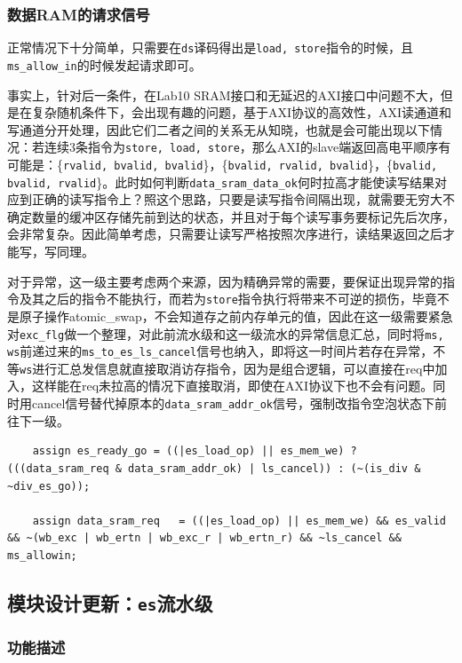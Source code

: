 \documentclass[UTF-8,twoside,c5size]{ctexart}
\begin{document}
	\subsubsection{数据RAM的请求信号}
	
	正常情况下十分简单，只需要在\texttt{ds}译码得出是\texttt{load, store}指令的时候，且\texttt{ms_allow_in}的时候发起请求即可。
	
	事实上，针对后一条件，在Lab10 SRAM接口和无延迟的AXI接口中问题不大，但是在复杂随机条件下，会出现有趣的问题，基于AXI协议的高效性，AXI读通道和写通道分开处理，因此它们二者之间的关系无从知晓，也就是会可能出现以下情况：若连续3条指令为\texttt{store, load, store}，那么AXI的slave端返回高电平顺序有可能是：\{\texttt{rvalid, bvalid, bvalid}\}，\{\texttt{bvalid, rvalid, bvalid}\}，\{\texttt{bvalid, bvalid, rvalid}\}。此时如何判断\texttt{data_sram_data_ok}何时拉高才能使读写结果对应到正确的读写指令上？照这个思路，只要是读写指令间隔出现，就需要无穷大不确定数量的缓冲区存储先前到达的状态，并且对于每个读写事务要标记先后次序，会非常复杂。因此简单考虑，只需要让读写严格按照次序进行，读结果返回之后才能写，写同理。
	
	对于异常，这一级主要考虑两个来源，因为精确异常的需要，要保证出现异常的指令及其之后的指令不能执行，而若为\texttt{store}指令执行将带来不可逆的损伤，毕竟不是原子操作atomic_swap，不会知道存之前内存单元的值，因此在这一级需要紧急对\texttt{exc_flg}做一个整理，对此前流水级和这一级流水的异常信息汇总，同时将\texttt{ms, ws}前递过来的\texttt{ms_to_es_ls_cancel}信号也纳入，即将这一时间片若存在异常，不等\texttt{ws}进行汇总发信息就直接取消访存指令，因为是组合逻辑，可以直接在req中加入，这样能在req未拉高的情况下直接取消，即使在AXI协议下也不会有问题。同时用cancel信号替代掉原本的\texttt{data_sram_addr_ok}信号，强制改指令空泡状态下前往下一级。
	
    \begin{verbatim}
    assign es_ready_go = ((|es_load_op) || es_mem_we) ? (((data_sram_req & data_sram_addr_ok) | ls_cancel)) : (~(is_div & ~div_es_go));

    assign data_sram_req   = ((|es_load_op) || es_mem_we) && es_valid && ~(wb_exc | wb_ertn | wb_exc_r | wb_ertn_r) && ~ls_cancel && ms_allowin;
    \end{verbatim}

	\subsection{模块设计更新：\texttt{es}流水级}
	
	\subsubsection{功能描述}
	
\end{document}
